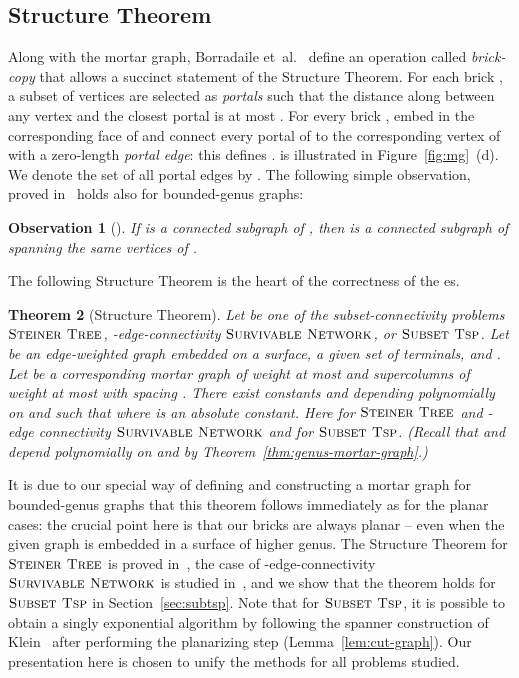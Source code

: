 \documentclass{article}
\newtheorem{theorem}{Theorem}
\newtheorem{observation}[theorem]{Observation}
\newcommand{\myproblemname}[1]{\ensuremath{\mbox{\sc #1}}\xspace}
\newcommand{\steiner}{\myproblemname{Steiner Tree}}
\newcommand{\subtsp}{\myproblemname{Subset Tsp}}
\newcommand{\survive}{\myproblemname{Survivable Network}}
\begin{document}
\subsection{Structure Theorem}\label{sec:structure-thm}

Along with the mortar graph, Borradaile et~al.~\cite{BorradaileKM09}
define an operation  called {\em brick-copy} that allows a
succinct statement of the Structure Theorem.  For each brick , a
subset of  vertices are selected as {\em portals} such that
the distance along  between any vertex and the closest
portal is at most .  For every brick ,
embed  in the corresponding face of  and connect every portal
of  to the corresponding vertex of  with a zero-length {\em
  portal edge}: this defines .   is
illustrated in Figure~\ref{fig:mg}~(d). We denote the set of all
portal edges by . The following simple observation, proved
in~\cite{BorradaileKM09} holds also for bounded-genus graphs:

\begin{observation}[\cite{BorradaileKM09}] \label{lem:soln} If  is a
  connected subgraph of , then  is a connected subgraph of  spanning the same vertices
  of .
\end{observation} 

The following Structure Theorem is the heart of the correctness of the
es.  

\begin{theorem}[Structure Theorem]
  Let  be one of the subset-connectivity problems \steiner,
  -edge-connectivity \survive, or \subtsp. Let  be
  an edge-weighted graph embedded on a surface,  a
  given set of terminals, and . Let
   be a corresponding mortar graph of weight at
  most  and supercolumns of weight at most  with spacing . There exist constants
   and  depending
  polynomially on  and  such that
   where  is an absolute constant.  Here  for \steiner and -edge
  connectivity \survive and  for \subtsp.
  (Recall that  and  depend polynomially on
   and  by Theorem~\ref{thm:genus-mortar-graph}.)
\end{theorem}

It is due to our special way of defining and constructing a mortar
graph for bounded-genus graphs that this theorem follows immediately
as for the planar cases: the crucial point here is that our bricks are
always planar -- even when the given graph is embedded in a surface of
higher genus. The Structure Theorem for \steiner is proved
in~\cite{BorradaileKM09}, the case of -edge-connectivity
\survive is studied in~\cite{BorradaileKlein08}, and we show that the
theorem holds for \subtsp in Section~\ref{sec:subtsp}. Note
  that for \subtsp, it is possible to obtain a singly exponential
  algorithm by following the spanner construction of
  Klein~\cite{Klein06} after performing the planarizing step
  (Lemma~\ref{lem:cut-graph}). Our presentation here is chosen to
  unify the methods for all problems studied.
\end{document}
